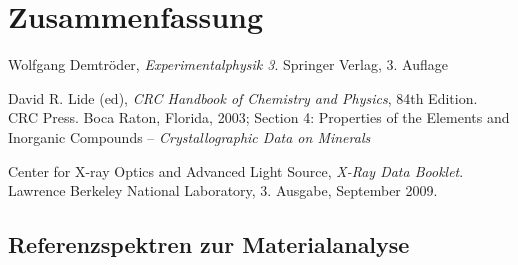 \documentclass[11pt, a4paper]{article}
\begin{document}
\section{Zusammenfassung}


\begin{thebibliography}{9}
	Wolfgang Demtröder,
	\emph{Experimentalphysik 3}.
	Springer Verlag,
	3. Auflage

  David R. Lide (ed),
  \emph{CRC Handbook of Chemistry and Physics},
  84th Edition. CRC Press. Boca Raton, Florida, 2003;
  Section 4: Properties of the Elements and Inorganic Compounds --
  \emph{Crystallographic Data on Minerals}

  Center for X-ray Optics and Advanced Light Source,
  \emph{X-Ray Data Booklet}.
  Lawrence Berkeley National Laboratory,
  3. Ausgabe,
  September 2009.
\end{thebibliography}

\newpage

\begin{appendix}
\section{Referenzspektren zur Materialanalyse}
\label{sec:referenzspektren}
\begin{figure}[h]
\centering
\resizebox{\columnwidth}{!}{%
}
\end{figure}

\begin{figure}[h]
\centering

\end{figure}

\end{appendix}
\end{document}
